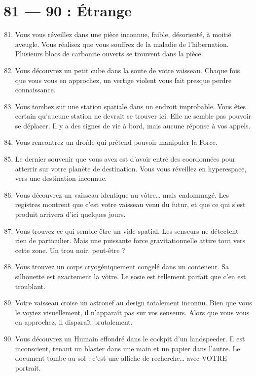 \documentclass{article}
\begin{document}
\section*{81 --- 90 : Étrange}
\begin{enumerate}
	\setcounter{enumi}{80}

	\item Vous vous réveillez dans une pièce inconnue, faible, désorienté, à moitié aveugle. Vous réalisez que vous souffrez de la maladie de l’hibernation. Plusieurs blocs de carbonite ouverts se trouvent dans la pièce.
	\item Vous découvrez un petit cube dans la soute de votre vaisseau. Chaque fois que vous vous en approchez, un vertige violent vous fait presque perdre connaissance.
	\item Vous tombez sur une station spatiale dans un endroit improbable. Vous êtes certain qu’aucune station ne devrait se trouver ici. Elle ne semble pas pouvoir se déplacer. Il y a des signes de vie à bord, mais aucune réponse à vos appels.
	\item Vous rencontrez un droïde qui prétend pouvoir manipuler la Force.
	\item Le dernier souvenir que vous avez est d’avoir entré des coordonnées pour atterrir sur votre planète de destination. Vous vous réveillez en hyperespace, vers une destination inconnue.
	\item Vous découvrez un vaisseau identique au vôtre… mais endommagé. Les registres montrent que c’est votre vaisseau venu du futur, et que ce qui s’est produit arrivera d’ici quelques jours.
	\item Vous trouvez ce qui semble être un vide spatial. Les senseurs ne détectent rien de particulier. Mais une puissante force gravitationnelle attire tout vers cette zone. Un trou noir, peut-être ?
	\item Vous trouvez un corps cryogéniquement congelé dans un conteneur. Sa silhouette est exactement la vôtre. Le sosie est tellement parfait que c’en est troublant.
	\item Votre vaisseau croise un astronef au design totalement inconnu. Bien que vous le voyiez visuellement, il n’apparaît pas sur vos senseurs. Alors que vous vous en approchez, il disparaît brutalement.
	\item Vous découvrez un Humain effondré dans le cockpit d’un landspeeder. Il est inconscient, tenant un blaster dans une main et un papier dans l’autre. Le document tombe au sol : c’est une affiche de recherche… avec VOTRE portrait.
\end{enumerate}
\end{document}
